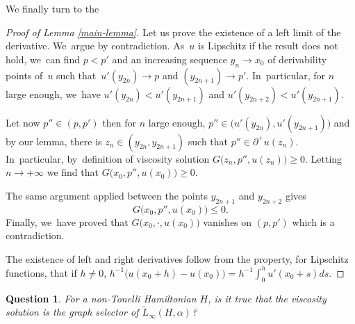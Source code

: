\documentclass[JEP,XML,SOM,Unicode,NoFloatCountersInSection,published]{cedram}
\newtheorem{question}{Question}
\theoremstyle{definition}
\begin{document}
\begin{appendix}
We finally turn to the
\begin{proof}[Proof of Lemma \ref{main-lemma}]
Let us prove the existence of a left limit of the derivative. We~argue by contradiction. As~$u$ is Lipschitz if the result does not hold, we~can find \hbox{$p<p'$} and an increasing sequence $y_n \!\to\! x_0$ of derivability points of~$u$ such that~\hbox{$u'(y_{2n}) \!\to\! p$} and $(y_{2n+1}) \to p'$. In~particular, for $n$ large enough, we~have $u'(y_{2n})<u'(y_{2n+1})$ and $u'(y_{2n+2})<u'(y_{2n+1})$.

Let now $p'' \in(p,p')$ then for $n$ large enough, $p'' \in \bigl(u'(y_{2n}),u'(y_{2n+1})\bigr)$ and by our lemma, there is $z_n \in (y_{2n},y_{2n+1})$ such that $p'' \in \partial^+ u(z_n)$. In~particular, by~definition of viscosity solution $G\bigl(z_n,p'',u(z_n)\bigr)\geqslant 0$. Letting $n\to +\infty$ we find that $G(x_0,p'',u(x_0)\bigr) \geqslant 0$.

The same argument applied between the points $y_{2n+1}$ and $y_{2n+2}$ gives\vspace*{-3pt}
\[
G(x_0,p'',u(x_0)\bigr) \leqslant 0.
\]
Finally, we~have proved that $G(x_0,\cdot ,u(x_0)\bigr)$ vanishes on $(p,p')$ which is a contradiction.

The existence of left and right derivatives follow from the property, for Lipschitz functions, that if $h\neq 0$, $h^{-1}\bigl(u(x_0+h)- u(x_0)\bigr) = h^{-1}\int_0^h u'(x_0+s)ds$.
\end{proof}


\begin{question}\label{quest:1}
For a non-Tonelli Hamiltonian $H$, is it true that the viscosity solution is the graph selector of $\tilde L_\infty(H,\alpha)$?
\end{question}


\end{appendix}
\end{document}
